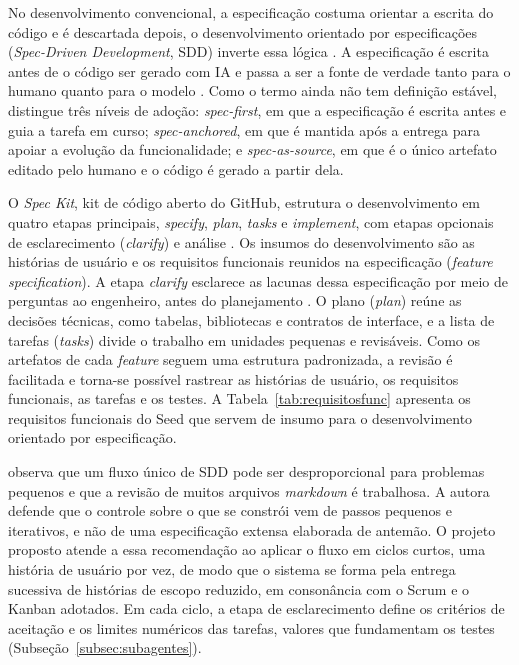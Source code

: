 No desenvolvimento convencional, a especificação costuma orientar a escrita do código e é descartada depois, o desenvolvimento orientado por especificações (\textit{Spec-Driven Development}, SDD) inverte essa lógica \cite{github_speckit}. A especificação é escrita antes de o código ser gerado com IA e passa a ser a fonte de verdade tanto para o humano quanto para o modelo \cite{bockeler_sdd_2025}. Como o termo ainda não tem definição estável,  distingue três níveis de adoção: \textit{spec-first}, em que a especificação é escrita antes e guia a tarefa em curso; \textit{spec-anchored}, em que é mantida após a entrega para apoiar a evolução da funcionalidade; e \textit{spec-as-source}, em que é o único artefato editado pelo humano e o código é gerado a partir dela.

O \textit{Spec Kit}, kit de código aberto do GitHub, estrutura o desenvolvimento em quatro etapas principais, \textit{specify}, \textit{plan}, \textit{tasks} e \textit{implement}, com etapas opcionais de esclarecimento (\textit{clarify}) e análise \cite{github_speckit}. Os insumos do desenvolvimento são as histórias de usuário e os requisitos funcionais reunidos na especificação (\textit{feature specification}). A etapa \textit{clarify} esclarece as lacunas dessa especificação por meio de perguntas ao engenheiro, antes do planejamento \cite{github_speckit}. O plano (\textit{plan}) reúne as decisões técnicas, como tabelas, bibliotecas e contratos de interface, e a lista de tarefas (\textit{tasks}) divide o trabalho em unidades pequenas e revisáveis. Como os artefatos de cada \textit{feature} seguem uma estrutura padronizada, a revisão é facilitada e torna-se possível rastrear as histórias de usuário, os requisitos funcionais, as tarefas e os testes. A Tabela~\ref{tab:requisitosfunc} apresenta os requisitos funcionais do Seed que servem de insumo para o desenvolvimento orientado por especificação.


 observa que um fluxo único de SDD pode ser desproporcional para problemas pequenos e que a revisão de muitos arquivos \textit{markdown} é trabalhosa. A autora defende que o controle sobre o que se constrói vem de passos pequenos e iterativos, e não de uma especificação extensa elaborada de antemão. O projeto proposto atende a essa recomendação ao aplicar o fluxo em ciclos curtos, uma história de usuário por vez, de modo que o sistema se forma pela entrega sucessiva de histórias de escopo reduzido, em consonância com o Scrum e o Kanban adotados. Em cada ciclo, a etapa de esclarecimento define os critérios de aceitação e os limites numéricos das tarefas, valores que fundamentam os testes (Subseção~\ref{subsec:subagentes}).
%
